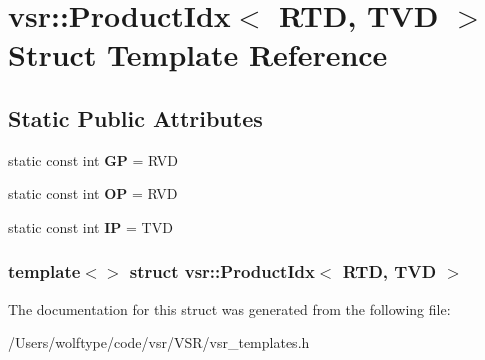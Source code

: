 \hypertarget{structvsr_1_1_product_idx_3_01_r_t_d_00_01_t_v_d_01_4}{\section{vsr\-:\-:Product\-Idx$<$ R\-T\-D, T\-V\-D $>$ Struct Template Reference}
\label{structvsr_1_1_product_idx_3_01_r_t_d_00_01_t_v_d_01_4}
}
\subsection*{Static Public Attributes}
\begin{DoxyCompactItemize}
\item 
\hypertarget{structvsr_1_1_product_idx_3_01_r_t_d_00_01_t_v_d_01_4_a6cc121cb01a392903592afb233b73835}{static const int {\bfseries G\-P} = R\-V\-D}\label{structvsr_1_1_product_idx_3_01_r_t_d_00_01_t_v_d_01_4_a6cc121cb01a392903592afb233b73835}

\item 
\hypertarget{structvsr_1_1_product_idx_3_01_r_t_d_00_01_t_v_d_01_4_aeaec2360dce67b8cf2a2914ffe9f1343}{static const int {\bfseries O\-P} = R\-V\-D}\label{structvsr_1_1_product_idx_3_01_r_t_d_00_01_t_v_d_01_4_aeaec2360dce67b8cf2a2914ffe9f1343}

\item 
\hypertarget{structvsr_1_1_product_idx_3_01_r_t_d_00_01_t_v_d_01_4_a66b92492100f8b7af7423f32b5d7a90f}{static const int {\bfseries I\-P} = T\-V\-D}\label{structvsr_1_1_product_idx_3_01_r_t_d_00_01_t_v_d_01_4_a66b92492100f8b7af7423f32b5d7a90f}

\end{DoxyCompactItemize}
\subsubsection*{template$<$$>$ struct vsr\-::\-Product\-Idx$<$ R\-T\-D, T\-V\-D $>$}



The documentation for this struct was generated from the following file\-:\begin{DoxyCompactItemize}
\item 
/\-Users/wolftype/code/vsr/\-V\-S\-R/vsr\-\_\-templates.\-h\end{DoxyCompactItemize}
